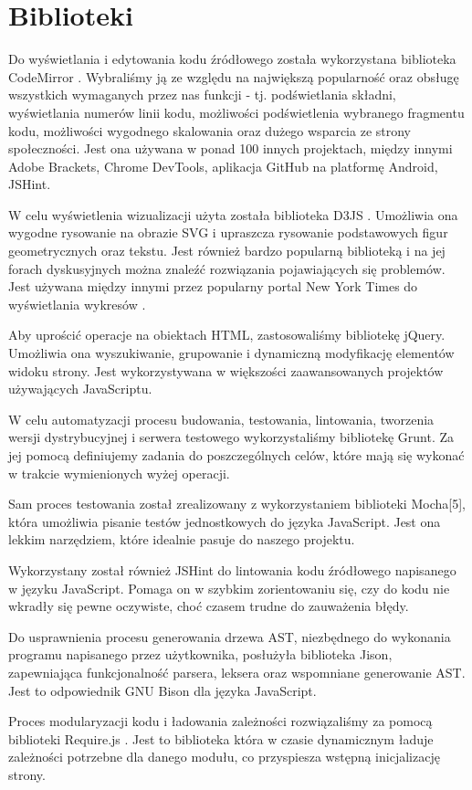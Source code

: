 \documentclass[a4paper,twoside,openright,11pt]{report}
\begin{document}
  \section{Biblioteki}
\par Do wyświetlania i edytowania kodu źródłowego została wykorzystana biblioteka CodeMirror \cite{cm}. Wybraliśmy ją ze względu na największą popularność oraz obsługę wszystkich wymaganych przez nas funkcji - tj. podświetlania składni, wyświetlania numerów linii kodu, możliwości podświetlenia wybranego fragmentu kodu, możliwości wygodnego skalowania oraz dużego wsparcia ze strony społeczności. Jest ona używana w ponad 100 innych projektach, między innymi Adobe Brackets, Chrome DevTools, aplikacja GitHub na platformę Android, JSHint. \cite{jshint}
\par W celu wyświetlenia wizualizacji użyta została biblioteka D3JS \cite{d3js}. Umożliwia ona wygodne rysowanie na obrazie SVG i upraszcza rysowanie podstawowych figur geometrycznych oraz tekstu. Jest również bardzo popularną biblioteką i na jej forach dyskusyjnych można znaleźć rozwiązania pojawiających się problemów. Jest używana między innymi przez popularny portal New York Times do wyświetlania wykresów \cite{ny}.
\par Aby uprościć operacje na obiektach HTML, zastosowaliśmy bibliotekę jQuery. \cite{jquery} Umożliwia ona wyszukiwanie, grupowanie i dynamiczną modyfikację elementów widoku strony. Jest wykorzystywana w większości zaawansowanych projektów używających JavaScriptu.
\par W celu automatyzacji procesu budowania, testowania, lintowania, tworzenia wersji dystrybucyjnej i serwera testowego wykorzystaliśmy bibliotekę Grunt.\cite{gruntjs} Za jej pomocą definiujemy zadania do poszczególnych celów, które mają się wykonać w trakcie wymienionych wyżej operacji. 
\par Sam proces testowania został zrealizowany z wykorzystaniem biblioteki Mocha[5], która umożliwia pisanie testów jednostkowych do języka JavaScript. Jest ona lekkim narzędziem, które idealnie pasuje do naszego projektu.
\par Wykorzystany został również JSHint\cite{jshint} do lintowania kodu źródłowego napisanego w języku JavaScript. Pomaga on w szybkim zorientowaniu się, czy do kodu nie wkradły się pewne oczywiste, choć czasem trudne do zauważenia błędy.
\par Do usprawnienia procesu generowania drzewa AST, niezbędnego do wykonania programu napisanego przez użytkownika, posłużyła biblioteka Jison\cite{jison}, zapewniająca funkcjonalność parsera, leksera oraz wspomniane generowanie AST. Jest to odpowiednik GNU Bison dla języka JavaScript.
\par Proces modularyzacji kodu i ładowania zależności rozwiązaliśmy za pomocą biblioteki Require.js \cite{requirejs}. Jest to biblioteka która w czasie dynamicznym ładuje zależności potrzebne dla danego modułu, co przyspiesza wstępną inicjalizację strony. 
\end{document}
